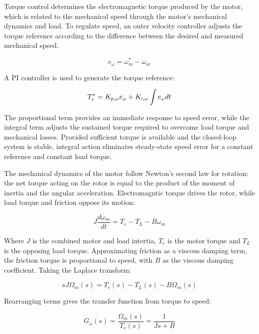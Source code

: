 \documentclass{article}
\begin{document}
Torque control determines the electromagnetic torque produced by the motor, which is related to the mechanical speed through the motor's mechanical dynamics and load. To regulate speed, an outer velocity controller adjusts the torque reference according to the difference between the desired and measured mechanical speed.

\begin{equation}
    e_\omega = \omega_m^* - \omega_m
\end{equation}

A PI controller is used to generate the torque reference:

\begin{equation}
    T_e^* = K_{p,\omega}e_\omega + K_{i,\omega}\int e_\omega \space dt
\end{equation}

The proportional term provides an immediate response to speed error, while the integral term adjusts the sustained torque required to overcome load torque and mechanical losses. Provided sufficient torque is available and the closed-loop system is stable, integral action eliminates steady-state speed error for a constant reference and constant load torque.

The mechanical dynamics of the motor follow Newton's second law for rotation: the net torque acting on the rotor is equal to the product of the moment of inertia and the angular acceleration. Electromagntic torque drives the rotor, while load torque and friction oppose its motion:

\begin{equation}
    J\frac{d\omega_m}{dt} = T_e - T_L - B\omega_m
\end{equation}

Where $J$ is the combined motor and load intertia, $T_e$ is the motor torque and $T_L$ is the opposing load torque. Approximating friction as a viscous damping term, the friction torque is proportional to speed, with $B$ as the viscous damping coefficient. Taking the Laplace transform:

\begin{equation}
    sJ\Omega_m(s) = T_e(s) - T_L(s) - B\Omega_m(s)
\end{equation}

Rearranging terms gives the transfer function from torque to speed:

\begin{equation}
    G_\omega(s) = \frac{\Omega_m(s)}{T_e(s)} = \frac{1}{Js+B}
\end{equation}
\end{document}
